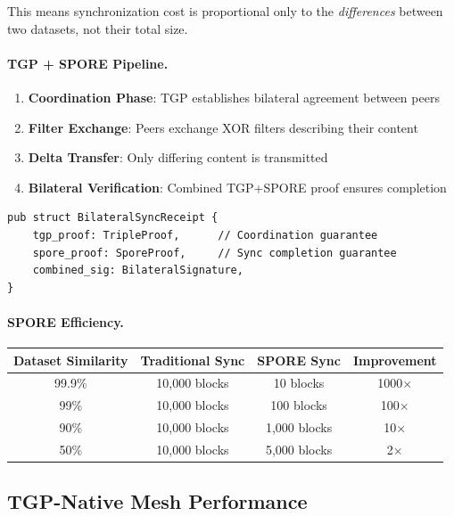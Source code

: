 This means synchronization cost is proportional only to the \emph{differences} between two datasets, not their total size.

\paragraph{TGP + SPORE Pipeline.}
\begin{enumerate}
    \item \textbf{Coordination Phase}: TGP establishes bilateral agreement between peers
    \item \textbf{Filter Exchange}: Peers exchange XOR filters describing their content
    \item \textbf{Delta Transfer}: Only differing content is transmitted
    \item \textbf{Bilateral Verification}: Combined TGP+SPORE proof ensures completion
\end{enumerate}

\begin{verbatim}
pub struct BilateralSyncReceipt {
    tgp_proof: TripleProof,      // Coordination guarantee
    spore_proof: SporeProof,     // Sync completion guarantee
    combined_sig: BilateralSignature,
}
\end{verbatim}

\paragraph{SPORE Efficiency.}

\begin{center}
\begin{tabular}{cccc}
\toprule
Dataset Similarity & Traditional Sync & SPORE Sync & Improvement \\
\midrule
99.9\% & 10,000 blocks & 10 blocks & 1000$\times$ \\
99\% & 10,000 blocks & 100 blocks & 100$\times$ \\
90\% & 10,000 blocks & 1,000 blocks & 10$\times$ \\
50\% & 10,000 blocks & 5,000 blocks & 2$\times$ \\
\bottomrule
\end{tabular}
\end{center}

\subsection{TGP-Native Mesh Performance}

